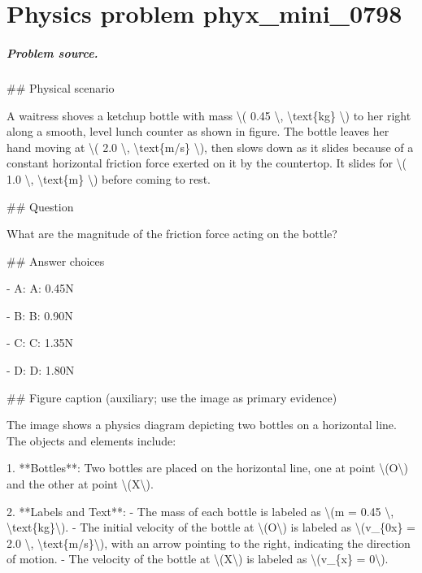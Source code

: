
\chapter{Physics problem phyx\_mini\_0798}
\label{ch:PhyXMiniProblems_problem_phyx_mini_0798}

\paragraph{Problem source.}
\#\# Physical scenario

A waitress shoves a ketchup bottle with mass \textbackslash{}( 0.45 \textbackslash{}, \textbackslash{}text\{kg\} \textbackslash{}) to her right along a smooth, level lunch counter as shown in figure. The bottle leaves her hand moving at \textbackslash{}( 2.0 \textbackslash{}, \textbackslash{}text\{m/s\} \textbackslash{}), then slows down as it slides because of a constant horizontal friction force exerted on it by the countertop. It slides for \textbackslash{}( 1.0 \textbackslash{}, \textbackslash{}text\{m\} \textbackslash{}) before coming to rest.

\#\# Question

What are the magnitude of the friction force acting on the bottle?

\#\# Answer choices

- A: A: 0.45N

- B: B: 0.90N

- C: C: 1.35N

- D: D: 1.80N

\#\# Figure caption (auxiliary; use the image as primary evidence)

The image shows a physics diagram depicting two bottles on a horizontal line. The objects and elements include:

1. **Bottles**: Two bottles are placed on the horizontal line, one at point \textbackslash{}(O\textbackslash{}) and the other at point \textbackslash{}(X\textbackslash{}).

2. **Labels and Text**:
   - The mass of each bottle is labeled as \textbackslash{}(m = 0.45 \textbackslash{}, \textbackslash{}text\{kg\}\textbackslash{}).
   - The initial velocity of the bottle at \textbackslash{}(O\textbackslash{}) is labeled as \textbackslash{}(v\_\{0x\} = 2.0 \textbackslash{}, \textbackslash{}text\{m/s\}\textbackslash{}), with an arrow pointing to the right, indicating the direction of motion.
   - The velocity of the bottle at \textbackslash{}(X\textbackslash{}) is labeled as \textbackslash{}(v\_\{x\} = 0\textbackslash{}).

